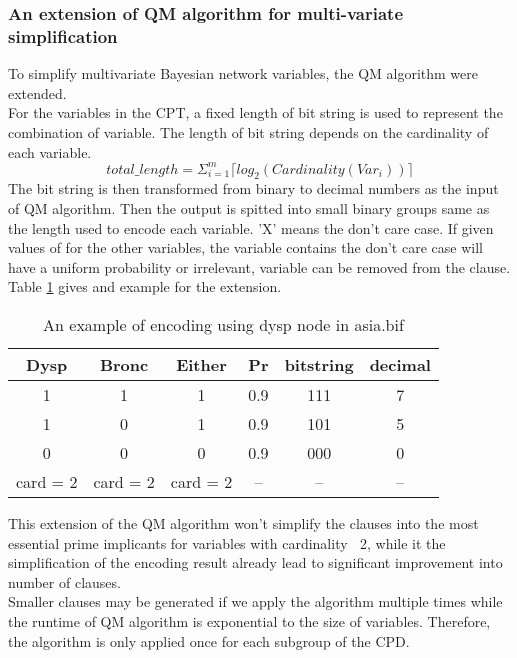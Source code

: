     \subsubsection{An extension of QM algorithm for multi-variate simplification}
    To simplify multi\-variate Bayesian network variables, the QM algorithm were extended.\\
    
    \noindent For the variables in the CPT, a fixed length of bit string is used to represent the combination of variable. The length of bit string depends on the cardinality of each variable. 
    $$total\_length = \Sigma_{i = 1}^{m} \lceil log_{2}(Cardinality(Var_{i}))\rceil$$
    The bit string is then transformed from binary to decimal numbers as the input of QM algorithm. Then the output is spitted into small binary groups same as the length used to encode each variable. 'X' means the don't care case. If given values of for the other variables, the variable contains the don't care case will have a uniform probability or irrelevant, variable can be removed from the clause. Table \ref{tab:QM encode} gives and example for the extension. \\
    
    \begin{table}[]
        \centering
        \begin{tabular}{c c c c |c c}
            \hline
            Dysp & Bronc & Either & Pr & bitstring & decimal \\
            \hline
            \hline
             1 & 1 & 1 & 0.9 & 111 & 7 \\
             1 & 0 & 1 & 0.9 & 101 & 5 \\
             0 & 0 & 0 & 0.9 & 000 & 0 \\
            \hline
            card = 2 & card = 2 & card = 2 & -- & -- & -- \\
            \hline
        \end{tabular}
        \caption{An example of encoding using dysp node in asia.bif}
        \label{tab:QM encode}
    \end{table}
    
    \noindent This extension of the QM algorithm won't simplify the clauses into the most essential prime implicants for variables with cardinality $\>$ 2, while it the simplification of the encoding result already lead to significant improvement into number of clauses.\\
    
    \noindent Smaller clauses may be generated if we apply the algorithm multiple times while the runtime of QM algorithm is exponential to the size of variables. Therefore, the algorithm is only applied once for each subgroup of the CPD.\\
    
